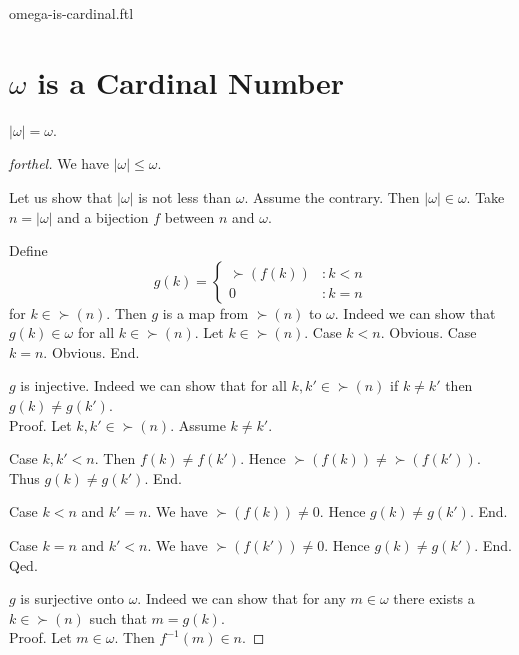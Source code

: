 \documentclass{naproche-library}
\begin{document}
\begin{smodule}{omega-is-cardinal.ftl}

  \section*{$\omega$ is a Cardinal Number}

  \begin{proposition}[forthel,id=SET_THEORY_07_4952029518626816]
    $|\omega| = \omega$.
  \end{proposition}
  \begin{proof}[forthel]
    We have $|\omega| \leq \omega$.

    Let us show that $|\omega|$ is not less than $\omega$.
      Assume the contrary.
      Then $|\omega| \in \omega$.
      Take $n = |\omega|$ and a bijection $f$ between $n$ and $\omega$.

      Define \[ g(k) =
        \begin{cases}
          \succ(f(k)) & : k < n
          \\
          0           & : k = n
        \end{cases} \]
      for $k \in \succ(n)$.
      Then $g$ is a map from $\succ(n)$ to $\omega$.
      Indeed we can show that $g(k) \in \omega$ for all $k \in \succ(n)$.
        Let $k \in \succ(n)$.
        Case $k < n$. Obvious.
        Case $k = n$. Obvious.
      End.

      $g$ is injective.
      Indeed we can show that for all $k, k' \in \succ(n)$ if $k \neq k'$
      then $g(k) \neq g(k')$. \\
      Proof.
        Let $k, k' \in \succ(n)$.
        Assume $k \neq k'$.

        Case $k, k' < n$.
          Then $f(k) \neq f(k')$.
          Hence $\succ(f(k)) \neq \succ(f(k'))$.
          Thus $g(k) \neq g(k')$.
        End.

        Case $k < n$ and $k' = n$.
          We have $\succ(f(k)) \neq 0$.
          Hence $g(k) \neq g(k')$.
        End.

        Case $k = n$ and $k' < n$.
          We have $\succ(f(k')) \neq 0$.
          Hence $g(k) \neq g(k')$.
        End.
      Qed.

      $g$ is surjective onto $\omega$.
      Indeed we can show that for any $m \in \omega$ there exists a $k \in \succ(n)$ such that $m = g(k)$. \\
      Proof.
        Let $m \in \omega$.
        Then $f^{-1}(m) \in n$.


\end{proof}
\end{smodule}
\end{document}

